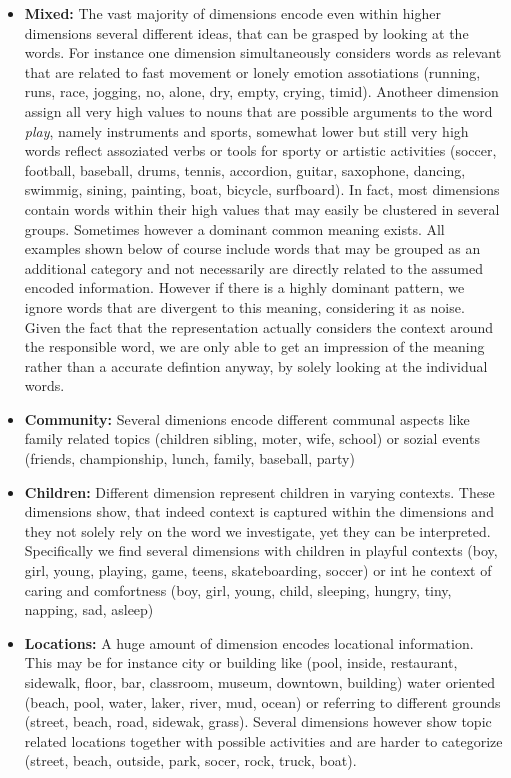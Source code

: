 \begin{itemize}
\item \textbf{Mixed:} The vast majority of dimensions encode even within higher dimensions several different ideas, that can be grasped by looking at the words. For instance one dimension simultaneously considers words as relevant that are related to fast movement or lonely emotion assotiations (running, runs, race, jogging, no, alone, dry, empty, crying, timid). Anotheer dimension assign all very high values to nouns that are possible arguments to the word \textit{play}, namely instruments and sports, somewhat lower but still very high words reflect assoziated verbs or tools for sporty or artistic activities (soccer, football, baseball, drums, tennis, accordion, guitar, saxophone, dancing, swimmig, sining, painting, boat, bicycle, surfboard). In fact, most dimensions contain words within their high values that may easily be clustered in several groups. Sometimes however a dominant common meaning exists. All examples shown below of course include words that may be grouped as an additional category and not necessarily are directly related to the assumed encoded information. However if there is a highly dominant pattern, we ignore words that are divergent to this meaning, considering it as noise. Given the fact that the representation actually considers the context around the responsible word, we are only able to get an impression of the meaning rather than a accurate defintion anyway, by solely looking at the individual words.
\item \textbf{Community:} Several dimenions encode different communal aspects like family related topics (children sibling, moter, wife, school) or sozial events (friends, championship, lunch, family, baseball, party)
\item \textbf{Children:} Different dimension represent children in varying contexts. These dimensions show, that indeed context is captured within the dimensions and they not solely rely on the word we investigate, yet they can be interpreted. Specifically we find several dimensions with children in playful contexts (boy, girl, young, playing, game, teens, skateboarding, soccer) or int he context of caring and comfortness (boy, girl, young, child, sleeping, hungry, tiny, napping, sad, asleep)
\item \textbf{Locations:} A huge amount of dimension encodes locational information. This may be for instance city or building like (pool, inside, restaurant, sidewalk, floor, bar, classroom, museum, downtown, building) water oriented (beach, pool, water, laker, river, mud, ocean) or referring to different grounds (street, beach, road, sidewak, grass). Several dimensions however show topic related locations together with possible activities and are harder to categorize (street, beach, outside, park, socer, rock, truck, boat).

\end{itemize}
